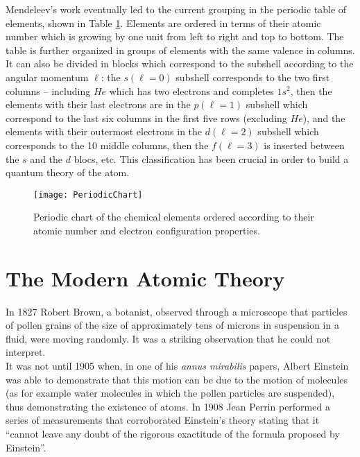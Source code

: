 Mendeleev's work eventually led to the current grouping in the periodic table of elements, shown in Table \ref{fig:PeriodicChart}. Elements are ordered in terms of their atomic number which is growing by one unit from left to right and top to bottom. The table is further organized in groups of elements with the same valence in columns. It can also be divided in blocks which correspond to the subshell according to the angular momentum $\ell$: the $s (\ell =0)$ subshell corresponds to the two first columns -- including $He$ which has two electrons and completes $1s
^2$, then the elements with their last electrons are in the $p (\ell =1)$ subshell which correspond to the last six columns in the first five rows (excluding $He$), and the elements with their outermost electrons in the $d (\ell =2)$ subshell which corresponds to the 10 middle columns, then the $f (\ell =3)$ is inserted between the $s$ and the $d$ blocs, etc. This classification has been crucial in order to build a quantum theory of the atom. 

\begin{figure}
  \centering
  \texttt{[image: PeriodicChart]}
\caption{Periodic chart of the chemical elements ordered according to their atomic number and electron configuration properties.}  \label{fig:PeriodicChart}
\end{figure}


\section{The Modern Atomic Theory}
In 1827 Robert Brown, a botanist, observed through a microscope that particles of pollen grains of the size of approximately tens of microns in suspension in a fluid, were moving randomly. It was a striking observation that he could not interpret. \\

It was not until 1905 when, in one of his {\it annus mirabilis} papers, Albert Einstein~\cite{BrownianMotion} was able to demonstrate that this motion can be due to the motion of molecules (as for example water molecules in which the pollen particles are suspended), thus demonstrating the existence of atoms. In 1908 Jean Perrin performed a series of measurements that corroborated Einstein's theory stating that it ``cannot leave any doubt of the rigorous exactitude of the formula proposed by Einstein''.

